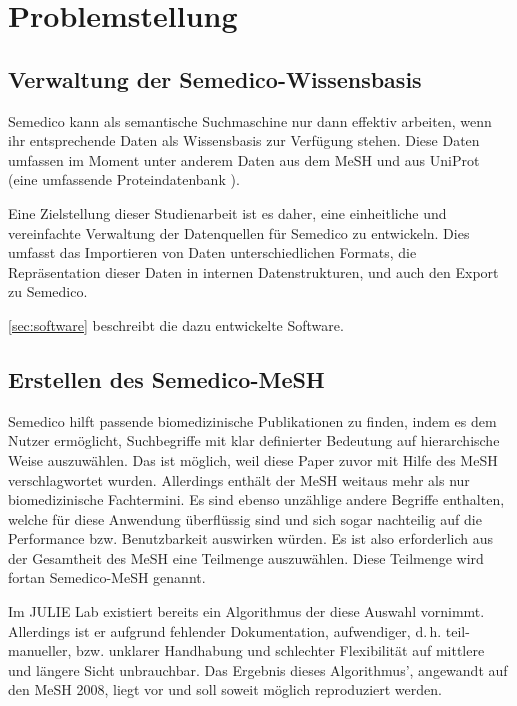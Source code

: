 \section{Problemstellung}
\label{sec:problemstellung}
\subsection*{Verwaltung der Semedico-Wissensbasis}
Semedico kann als semantische Suchmaschine nur dann effektiv arbeiten, wenn ihr entsprechende Daten als Wissensbasis zur Verfügung stehen. Diese Daten umfassen im Moment unter anderem Daten aus dem MeSH und aus UniProt (eine umfassende Proteindatenbank \cite{Consortium2011}).\par
Eine Zielstellung dieser Studienarbeit ist es daher, eine einheitliche und vereinfachte Verwaltung der Datenquellen für Semedico zu entwickeln. Dies umfasst das Importieren von Daten unterschiedlichen Formats, die Repräsentation dieser Daten in internen Datenstrukturen, und auch den Export zu Semedico. \par

\autoref{sec:software} \textit{} beschreibt die dazu entwickelte Software.

\subsection*{Erstellen des Semedico-MeSH}
\label{sec:MeSH_erstellen}
Semedico hilft passende biomedizinische Publikationen zu finden, indem es dem Nutzer ermöglicht, Suchbegriffe mit klar definierter Bedeutung auf hierarchische Weise auszuwählen. %
Das ist möglich, weil diese Paper zuvor mit Hilfe des MeSH verschlagwortet wurden. Allerdings enthält der MeSH weitaus mehr als nur biomedizinische Fachtermini. Es sind ebenso unzählige andere Begriffe enthalten, welche für diese Anwendung überflüssig sind und sich sogar nachteilig auf die Performance bzw. Benutzbarkeit auswirken würden. 
Es ist also erforderlich aus der Gesamtheit des MeSH eine Teilmenge auszuwählen. Diese Teilmenge wird fortan Semedico-MeSH genannt. \par

Im JULIE Lab existiert bereits ein Algorithmus der diese Auswahl vornimmt. Allerdings ist er aufgrund fehlender Dokumentation, aufwendiger, d.\,h. teil-manueller, bzw. unklarer Handhabung und schlechter Flexibilität auf mittlere und längere Sicht unbrauchbar. Das Ergebnis dieses Algorithmus', angewandt auf den MeSH 2008, liegt vor und soll soweit möglich reproduziert werden. \par


